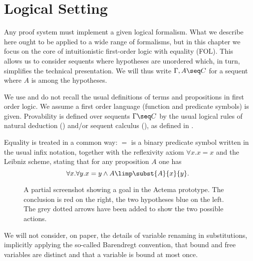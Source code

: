 

\section{Logical Setting}
Any proof system must implement a given logical formalism. What we
describe here ought to be applied to a wide range of formalisms, but
in this chapter we focus on the core of intuitionistic first-order logic
with equality (FOL). This allows us to consider sequents where
hypotheses are unordered which, in turn, simplifies the technical
presentation.  We will thus write $\Gamma,A \seq C$ for a sequent
where $A$ is among the hypotheses.

We use and do not recall the usual definitions of terms and propositions in
first order logic. We assume a first order language (function and predicate
symbols) is given. Provability is defined over sequents $\Gamma\seq C$ by the
usual logical rules of natural deduction () and/or sequent calculus
(), as defined in .

Equality is treated in a common way: $=$ is a binary
predicate symbol written in the usual infix notation, together with the
reflexivity axiom $\forall x.x=x$ and the Leibniz scheme, stating that for any
proposition $A$ one has
$$\forall x.\forall y. x=y\land A \limp \subst{A}{x}{y}.$$

\begin{figure*}
 \begin{center}
 \end{center}
 \caption{A partial screenshot showing a goal in the Actema prototype. The
   conclusion is red on the right, the two hypotheses blue on the
   left. The grey dotted arrows have been added to show the two
   possible actions.}
 \end{figure*}

We will not consider, on paper, the details of variable renaming in
substitutions, implicitly applying the so-called Barendregt
convention, that bound and free variables are distinct and that a
variable is bound at most once.

